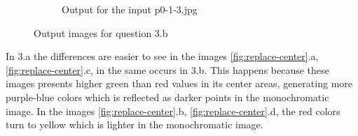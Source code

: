 \begin{enumerate}[label=\emph{\alph*)}]
\begin{figure}[h!]
\begin{subfigure}{0.5\textwidth}
  \caption{Output for the input p0-1-3.jpg}
  \label{fig:sfig2}
\end{subfigure}
\caption{Output images for question 3.b}
\label{fig:replace-channel}
\end{figure}

In 3.a the differences are easier to see in the images \ref{fig:replace-center}.a, \ref{fig:replace-center}.c, in the same occurs in 3.b. This happens because these images presents higher green than red values in its center areas, generating more purple-blue colors which is reflected as darker points in the monochromatic image. In the images \ref{fig:replace-center}.b,  \ref{fig:replace-center}.d, the red colors turn to yellow which is lighter in the monochromatic image.

\end{enumerate}
